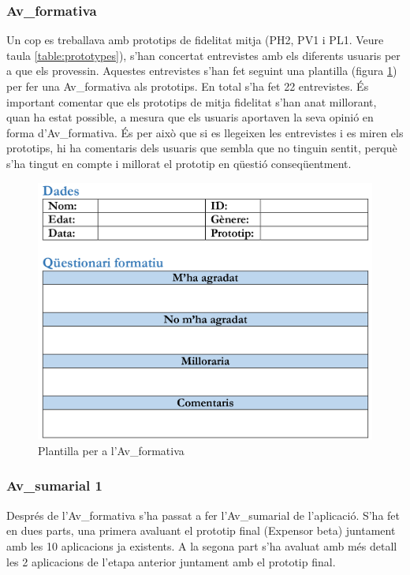 \subsubsection{\Gls{Av_formativa}}
Un cop es treballava amb prototips de fidelitat mitja (PH2, PV1 i PL1. Veure taula \ref{table:prototypes}), s'han concertat entrevistes amb els diferents usuaris per a que els provessin. Aquestes entrevistes s'han fet seguint una plantilla (figura \ref{fig:qf}) per fer una \gls{Av_formativa} als prototips. En total s'ha fet 22 entrevistes. %
És important comentar que els prototips de mitja fidelitat s'han anat millorant, quan ha estat possible, a mesura que els usuaris aportaven la seva opinió en forma d'\gls{Av_formativa}. És per això que si es llegeixen les entrevistes i es miren els prototips, hi ha comentaris dels usuaris que sembla que no tinguin sentit, perquè s'ha tingut en compte i millorat el prototip en qüestió conseqüentment. 

\begin{figure}[htp]
\centering
\includegraphics[scale=1]{qf.png}
\caption{Plantilla per a l'\gls{Av_formativa} }\label{fig:qf}
\end{figure}

\subsubsection{\Gls{Av_sumarial} 1}
Després de l'\gls{Av_formativa} s'ha passat a fer l'\gls{Av_sumarial} de l'aplicació. S'ha fet en dues parts, una primera avaluant  el prototip final (Expensor beta) juntament amb les 10 aplicacions ja existents. A la segona part s'ha avaluat amb més detall les 2 aplicacions de l'etapa anterior juntament amb el prototip final.

